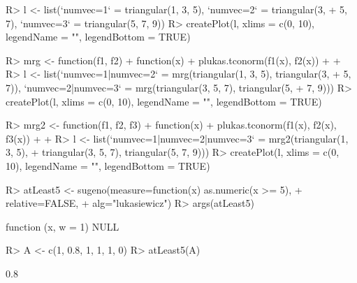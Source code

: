 \documentclass{article}\usepackage[]{graphicx}\usepackage[]{color}
\begin{document}
\begin{Schunk}
\begin{Sinput}
R> l <- list(`numvec=1` = triangular(1, 3, 5), `numvec=2` = triangular(3, 
+      5, 7), `numvec=3` = triangular(5, 7, 9))
R> createPlot(l, xlims = c(0, 10), legendName = "", legendBottom = TRUE)
\end{Sinput}
\end{Schunk}

\begin{Schunk}
\begin{Sinput}
R> mrg <- function(f1, f2) {
+      function(x) {
+          plukas.tconorm(f1(x), f2(x))
+      }
+  }
R> l <- list(`numvec=1|numvec=2` = mrg(triangular(1, 3, 5), triangular(3, 
+      5, 7)), `numvec=2|numvec=3` = mrg(triangular(3, 5, 7), triangular(5, 
+      7, 9)))
R> createPlot(l, xlims = c(0, 10), legendName = "", legendBottom = TRUE)
\end{Sinput}
\end{Schunk}

\begin{Schunk}
\begin{Sinput}
R> mrg2 <- function(f1, f2, f3) {
+      function(x) {
+          plukas.tconorm(f1(x), f2(x), f3(x))
+      }
+  }
R> l <- list(`numvec=1|numvec=2|numvec=3` = mrg2(triangular(1, 3, 5), 
+      triangular(3, 5, 7), triangular(5, 7, 9)))
R> createPlot(l, xlims = c(0, 10), legendName = "", legendBottom = TRUE)
\end{Sinput}
\end{Schunk}

\begin{Schunk}
% --begin: "quant1"
\begin{Sinput}
R> atLeast5 <- sugeno(measure=function(x) as.numeric(x >= 5),
+                     relative=FALSE,
+                     alg="lukasiewicz")
R> args(atLeast5)
\end{Sinput}
\begin{Soutput}
function (x, w = 1) 
NULL
\end{Soutput}
%
% --end: "quant1"
\end{Schunk}

\begin{Schunk}
% --begin: "quant2"
\begin{Sinput}
R> A <- c(1, 0.8, 1, 1, 1, 0)
R> atLeast5(A)
\end{Sinput}
\begin{Soutput}
[1] 0.8
\end{Soutput}
%
% --end: "quant2"
\end{Schunk}
\end{document}
